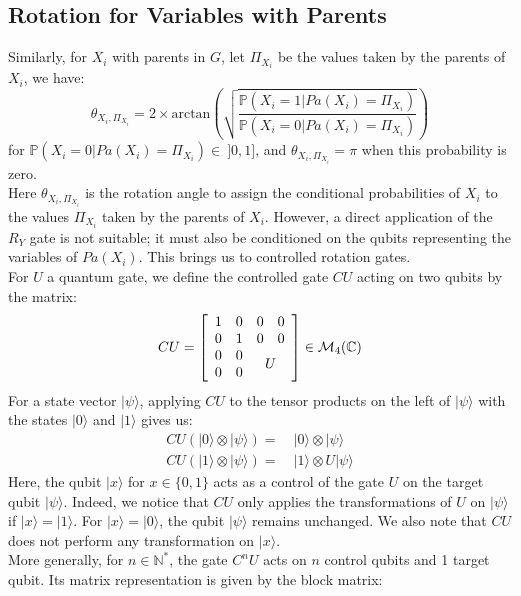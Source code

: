 \subsection{Rotation for Variables with Parents}
\label{multi_rotation_calc}
Similarly, for $X_i$ with parents in $G$, let $\Pi_{X_i}$ be the values taken by the parents of $X_i$, we have:
\[
\theta_{X_i,\Pi_{X_i}} = 
2\times\mathrm{arctan}\left(\sqrt{\frac{\displaystyle \mathbb{P}(X_i=1|Pa(X_i)=\Pi_{X_i})}{\displaystyle \mathbb{P}(X_i=0|Pa(X_i)=\Pi_{X_i})}}\right) 
\]
for $\mathbb{P}(X_i=0|Pa(X_i)=\Pi_{X_i}) \in \ ]0,1]$, and
$\theta_{X_i,\Pi_{X_i}} =  \pi$ when this probability is zero.
\\
Here $\theta_{X_i,\Pi_{X_i}}$ is the rotation angle to assign the conditional probabilities of $X_i$ to the values $\Pi_{X_i}$ taken by the parents of $X_i$. However, a direct application of the $R_Y$ gate is not suitable; it must also be conditioned on the qubits representing the variables of $Pa(X_i)$.
This brings us to controlled rotation gates.
\\
For $U$ a quantum gate, we define the controlled gate $CU$ acting on two qubits by the matrix:
\[CU =
\left[
\begin{array}{cccc}
    1 & 0 & 0 & 0 \\
    0 & 1 & 0 & 0 \\
    0 & 0 & \multicolumn{2}{c}{\smash{\raisebox{-.5\normalbaselineskip}{$U$}}} \\
    0 & 0 &  & 
\end{array}
\right]
\in \mathcal{M}_{4}(\mathbb{C})
\]
For a state vector $|\psi\rangle$, applying $CU$ to the tensor products on the left of $|\psi\rangle$ with the states $|0\rangle$ and $|1\rangle$ gives us:
\begin{align*}
CU (|0\rangle \otimes |\psi\rangle) =&\ |0\rangle \otimes |\psi\rangle \\
CU (|1\rangle \otimes |\psi\rangle) =&\ |1\rangle \otimes U|\psi\rangle 
\end{align*}
Here, the qubit $|x\rangle$ for $x\in\{0,1\}$ acts as a control of the gate $U$ on the target qubit $|\psi\rangle$. Indeed, we notice that $CU$ only applies the transformations of $U$ on $|\psi\rangle$ if $|x\rangle = |1\rangle$. For $|x\rangle = |0\rangle$, the qubit $|\psi\rangle$ remains unchanged. We also note that $CU$ does not perform any transformation on $|x\rangle$. 
\\
More generally, for $n\in\mathbb{N}^*$, the gate $C^nU$ acts on $n$ control qubits and 1 target qubit. Its matrix representation is given by the block matrix:
